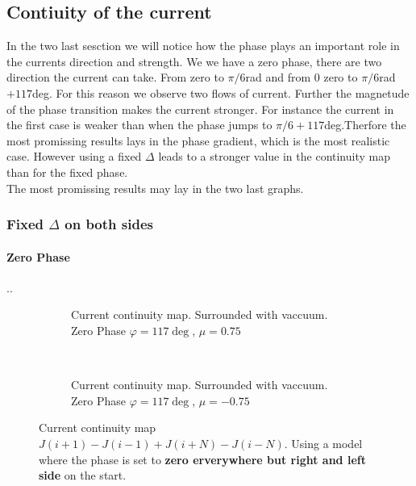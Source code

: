 \documentclass[../main.tex]{subfiles}
\begin{document}
\subsection{Contiuity of the current}

In the two last sesction we will notice how the phase plays an important role in the currents direction and strength. We we have a zero phase, there are two direction 
the current can take. From zero to $\pi/6$rad and from 0
zero to $\pi/6$rad $+ 117$deg. For this reason we observe two flows of current. Further the magnetude of the phase transition makes the current stronger. For instance the 
current in the first case is weaker than when the phase jumps to $\pi/6 + 117$deg.Therfore the most promissing results lays in the phase gradient, which is the most realistic case. However 
using a fixed $\Delta$ leads to a stronger value in the continuity map than for the fixed phase. \\

The most promissing results may lay in the two last graphs.

\subsubsection{Fixed $\Delta$ on both sides}
\paragraph{Zero Phase}..

\begin{figure}[H]
    \begin{subfigure}{0.4\textwidth}
        \centering
        \hspace{-4cm} %
        
        \caption{Current continuity map. Surrounded with vaccuum. Zero Phase $\varphi = 117\deg$, $\mu = 0.75$}
        \label{fig:first}
    \end{subfigure}    \\
    \begin{subfigure}{0.4\textwidth}
        \centering
        \hspace{-4cm} %
        
        \caption{Current continuity map. Surrounded with vaccuum. Zero Phase $\varphi = 117\deg$, $\mu = -0.75$}
        \label{fig:first}
    \end{subfigure}    
    \caption{ Current continuity map $J(i+1) - J(i-1) + J(i+N)- J(i-N)$. Using a model where the phase is set to \textbf{zero erverywhere but right and left side} on the start.}
\end{figure}
\end{document}
